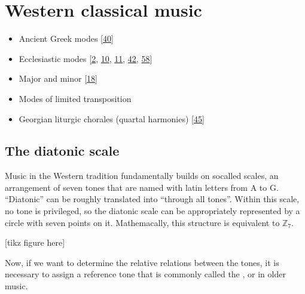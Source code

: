 \documentclass[letterpaper,10pt,english]{sphinxmanual}
\begin{document}
\section{Western classical music}
\label{\detokenize{2_scales_modes:western-classical-music}}\begin{itemize}
\item {} 
\sphinxAtStartPar
Ancient Greek modes {[}\hyperlink{cite.8_bibliography:id45}{40}{]}

\item {} 
\sphinxAtStartPar
Ecclesiastic modes {[}\hyperlink{cite.8_bibliography:id48}{2}, \hyperlink{cite.8_bibliography:id56}{10}, \hyperlink{cite.8_bibliography:id57}{11}, \hyperlink{cite.8_bibliography:id58}{42}, \hyperlink{cite.8_bibliography:id47}{58}{]}

\item {} 
\sphinxAtStartPar
Major and minor {[}\hyperlink{cite.8_bibliography:id64}{18}{]}

\item {} 
\sphinxAtStartPar
Modes of limited transposition

\item {} 
\sphinxAtStartPar
Georgian liturgic chorales (quartal harmonies) {[}\hyperlink{cite.8_bibliography:id14}{45}{]}

\end{itemize}


\subsection{The diatonic scale}
\label{\detokenize{2_scales_modes:the-diatonic-scale}}
\sphinxAtStartPar
Music in the Western tradition fundamentally builds on
so\sphinxhyphen{}called  scales, an arrangement of seven tones
that are named with latin letters from A to G. “Diatonic” can
be roughly translated into “through all tones”. Within this scale,
no tone is privileged, so the diatonic scale can be appropriately
represented by a circle with seven points on it. Mathemacally,
this structure is equivalent to \(\mathbb{Z}_7\).

\sphinxAtStartPar
{[}tikz figure here{]}

\sphinxAtStartPar
Now, if we want to determine the relative relations between the tones,
it is necessary to assign a reference tone that is commonly called the ,
or  in older music.
\end{document}
